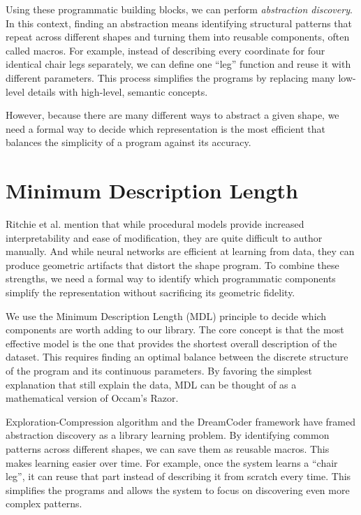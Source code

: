 \documentclass{thesis}
\begin{document}
Using these programmatic building blocks, we can perform \textit{abstraction discovery}. In this context, finding an abstraction means identifying structural patterns that repeat across different shapes and turning them into reusable components, often called macros. For example, instead of describing every coordinate for four identical chair legs separately, we can define one ``leg'' function and reuse it with different parameters. This process simplifies the programs by replacing many low-level details with high-level, semantic concepts.

However, because there are many different ways to abstract a given shape, we need a formal way to decide which representation is the most efficient that balances the simplicity of a program against its accuracy.

\section{Minimum Description Length}\label{back_neurosymbolic}

Ritchie et al. \cite{Ritchie2023} mention that while procedural models provide increased interpretability and ease of modification, they are quite difficult to author manually. And while neural networks are efficient at learning from data, they can produce geometric artifacts that distort the shape program. To combine these strengths, we need a formal way to identify which programmatic components simplify the representation without sacrificing its geometric fidelity.

We use the Minimum Description Length (MDL) principle \cite{Rissanen1978} to decide which components are worth adding to our library. The core concept is that the most effective model is the one that provides the shortest overall description of the dataset. This requires finding an optimal balance between the discrete structure of the program and its continuous parameters. By favoring the simplest explanation that still explain the data, MDL can be thought of as a mathematical version of Occam's Razor.

Exploration-Compression algorithm \cite{Dechter2013} and the DreamCoder framework \cite{DreamCoder} have framed abstraction discovery as a library learning problem. By identifying common patterns across different shapes, we can save them as reusable macros. This makes learning easier over time. For example, once the system learns a ``chair leg'', it can reuse that part instead of describing it from scratch every time. This simplifies the programs and allows the system to focus on discovering even more complex patterns.
\end{document}
